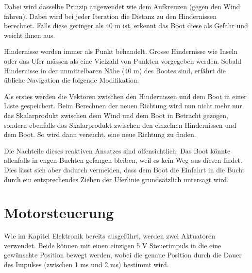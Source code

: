 Dabei wird dasselbe Prinzip angewendet wie dem Aufkreuzen (gegen den Wind fahren). Dabei wird bei jeder Iteration die Distanz zu den Hindernissen berechnet. Falls diese geringer als 40 m ist, erkennt das Boot diese als Gefahr und weicht ihnen aus.  

Hindernisse werden immer als Punkt behandelt. Grosse Hindernisse wie Inseln oder das Ufer müssen als eine Vielzahl von Punkten vorgegeben werden. Sobald Hindernisse in der unmittelbaren Nähe (40 m) des Bootes sind, erfährt die übliche Navigation die folgende Modifikation.

Als erstes werden die Vektoren zwischen den Hindernissen und dem Boot in einer Liste gespeichert. Beim Berechnen der neuen Richtung wird nun nicht mehr nur das Skalarprodukt zwischen dem Wind und dem Boot in Betracht gezogen, sondern ebenfalls das Skalarprodukt zwischen den einzelnen Hindernissen und dem Boot. So wird dann versucht, eine neue Richtung zu finden.

Die Nachteile dieses reaktiven Ansatzes sind offensichtlich. Das Boot könnte allenfalls in engen Buchten gefangen bleiben, weil es kein Weg aus diesen findet. Dies lässt sich aber dadurch vermeiden, dass dem Boot die Einfahrt in die Bucht durch ein entsprechendes Ziehen der Uferlinie grundsätzlich untersagt wird. 
\section{Motorsteuerung}
Wie im Kapitel Elektronik bereits ausgeführt, werden zwei Aktuatoren verwendet. Beide können mit einen einzigen 5 V Steuerimpuls in die eine gewünschte Position bewegt werden, wobei die genaue Position durch die Dauer des Impulses (zwischen 1 ms und 2 ms) bestimmt wird. 
